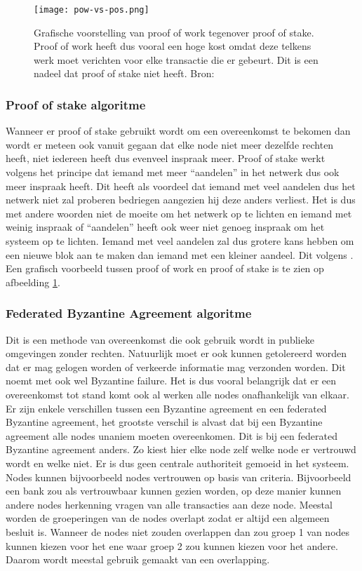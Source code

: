 \begin{figure}
	\texttt{[image: pow-vs-pos.png]}
	\caption{Grafische voorstelling van proof of work tegenover proof of stake. Proof of work heeft dus vooral een hoge kost omdat deze telkens werk moet verichten voor elke transactie die er gebeurt. Dit is een nadeel dat proof of stake niet heeft.  Bron: \textcite{blockgeeks} }
	\label{fig:pow-vs-pos}
\end{figure}

\subsubsection{Proof of stake algoritme}
Wanneer er proof of stake gebruikt wordt om een overeenkomst te bekomen dan wordt er meteen ook vanuit gegaan dat elke node niet meer dezelfde rechten heeft, niet iedereen heeft dus evenveel inspraak meer. Proof of stake werkt volgens het principe dat iemand met meer ``aandelen'' in het netwerk dus ook meer inspraak heeft. Dit heeft als voordeel dat iemand met veel aandelen dus het netwerk niet zal proberen bedriegen aangezien hij deze anders verliest. Het is dus met andere woorden niet de moeite om het netwerk op te lichten en iemand met weinig inspraak of ``aandelen'' heeft ook weer niet genoeg inspraak om het systeem op te lichten. Iemand met veel aandelen zal dus grotere kans hebben om een nieuwe blok aan te maken dan iemand met een kleiner aandeel. Dit volgens \textcite{Buterin2013}. Een grafisch voorbeeld tussen proof of work en proof of stake is te zien op afbeelding \ref{fig:pow-vs-pos}.

\subsubsection{Federated Byzantine Agreement algoritme}
Dit is een methode van overeenkomst die ook gebruik wordt in publieke omgevingen zonder rechten. Natuurlijk moet er ook kunnen getolereerd worden dat er mag gelogen worden of verkeerde informatie mag verzonden worden. Dit noemt met ook wel Byzantine failure. Het is dus vooral belangrijk dat er een overeenkomst tot stand komt ook al werken alle nodes onafhankelijk van elkaar. Er zijn enkele verschillen tussen een Byzantine agreement en een federated Byzantine agreement, het grootste verschil is alvast dat bij een Byzantine agreement alle nodes unaniem moeten overeenkomen. Dit is bij een federated Byzantine agreement anders. Zo kiest hier elke node zelf welke node er vertrouwd wordt en welke niet. Er is dus geen centrale authoriteit gemoeid in het systeem. Nodes kunnen bijvoorbeeld nodes vertrouwen op basis van criteria. Bijvoorbeeld een bank zou als vertrouwbaar kunnen gezien worden, op deze manier kunnen andere nodes herkenning vragen van alle transacties aan deze node. Meestal worden de groeperingen van de nodes overlapt zodat er altijd een algemeen besluit is. Wanneer de nodes niet zouden overlappen dan zou groep 1 van nodes kunnen kiezen voor het ene waar groep 2 zou kunnen kiezen voor het andere. Daarom wordt meestal gebruik gemaakt van een overlapping.

